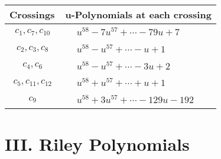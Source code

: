 \documentclass[1p]{elsarticle_modified}
\theoremstyle{definition}
\begin{document}
\begin{tabular}{m{50pt}|m{274pt}}
Crossings & \hspace{64pt}u-Polynomials at each crossing \\
\hline $$\begin{aligned}c_{1},c_{7},c_{10}\end{aligned}$$&$\begin{aligned}
&u^{58}-7 u^{57}+\cdots-79 u+7
\end{aligned}$\\
\hline $$\begin{aligned}c_{2},c_{3},c_{8}\end{aligned}$$&$\begin{aligned}
&u^{58}- u^{57}+\cdots- u+1
\end{aligned}$\\
\hline $$\begin{aligned}c_{4},c_{6}\end{aligned}$$&$\begin{aligned}
&u^{58}- u^{57}+\cdots-3 u+2
\end{aligned}$\\
\hline $$\begin{aligned}c_{5},c_{11},c_{12}\end{aligned}$$&$\begin{aligned}
&u^{58}+u^{57}+\cdots+u+1
\end{aligned}$\\
\hline $$\begin{aligned}c_{9}\end{aligned}$$&$\begin{aligned}
&u^{58}+3 u^{57}+\cdots-129 u-192
\end{aligned}$\\
\hline
\end{tabular}\newpage\renewcommand{\arraystretch}{1}
\centering \section*{ III. Riley Polynomials}
\end{document}
